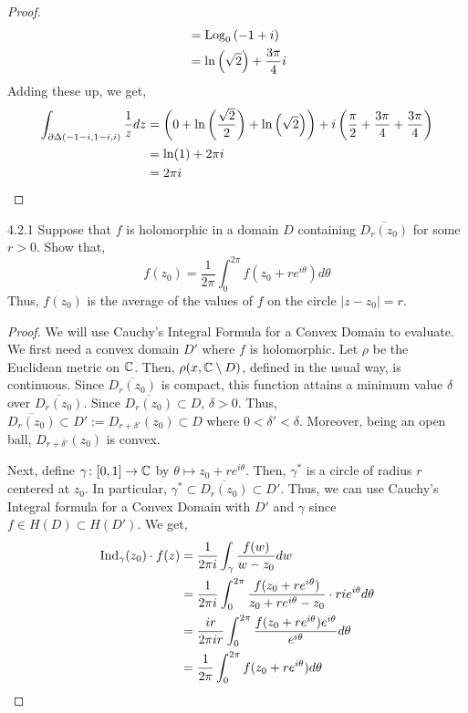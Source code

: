 \documentclass[12pt]{amsart}
\begin{document}
\begin{proof}
\begin{align*}
       &= \operatorname{Log}_0\left(-1+i\right) \\
       &= \ln\left(\sqrt{2}\right) + \frac{3\pi}{4}i
    \end{align*}
    Adding these up, we get,
    \begin{align*}
        \int_{\partial\Delta(-1-i, 1-i, i)} \frac{1}{z} dz &= \left(0 + \ln\left(\frac{\sqrt{2}}{2}\right)+ \ln\left(\sqrt{2}\right)\right) + i\left( \frac{\pi}{2} + \frac{3\pi}{4} + \frac{3\pi}{4}\right) \\
        &= \ln(1) + 2\pi i \\ 
        &= 2\pi i
    \end{align*}
\end{proof}
\newpage

\begin{problem}{4.2.1}
    Suppose that $f$ is holomorphic in a domain $D$ containing $\overline{D_r(z_0)}$ for some $r > 0$. Show that, 
    \[ f(z_0) = \frac{1}{2\pi} \int_0^{2\pi} f(z_0 + re^{i\theta})d\theta\]
    Thus, $f(z_0)$ is the average of the values of $f$ on the circle $|z-z_0| = r$. 
\end{problem}
\begin{proof}
    We will use Cauchy's Integral Formula for a Convex Domain to evaluate. We first need a convex domain $D'$ where $f$ is holomorphic. Let $\rho$ be the Euclidean metric on $\mathbb C$. Then, $\rho(x, \mathbb C \setminus D)$, defined in the usual way, is continuous. Since $\overline{D_r(z_0)}$ is compact, this function attains a minimum value $\delta$ over $\overline{D_r(z_0)}$. Since $\overline{D_r(z_0)} \subset D$, $\delta > 0$. Thus, $\overline{D_r(z_0)} \subset D' := D_{r+\delta'}(z_0) \subset D$ where $0 < \delta' < \delta$. Moreover, being an open ball, $D_{r+\delta'}(z_0)$ is convex.
    
    Next, define $\gamma\colon [0, 1] \to \mathbb C$ by $\theta \mapsto z_0 + re^{i\theta}$. Then, $\gamma^*$ is a circle of radius $r$ centered at $z_0$. In particular, $\gamma^* \subset \overline{D_r(z_0)} \subset D'$. Thus, we can use Cauchy's Integral formula for a Convex Domain with $D'$ and $\gamma$ since $f \in H(D) \subset H(D')$. We get, 
    \begin{align*}
        \operatorname{Ind}_\gamma(z_0) \cdot f(z) &= \frac{1}{2\pi i}\int_\gamma \frac{f(w)}{w-z_0} dw \\
        &= \frac{1}{2\pi i}\int_0^{2\pi} \frac{f(z_0+re^{i\theta})}{z_0+re^{i\theta}-z_0} \cdot rie^{i\theta} d\theta \\
        &= \frac{ir}{2\pi i r}\int_0^{2\pi} \frac{f(z_0+re^{i\theta})e^{i\theta}}{e^{i\theta}} d\theta \\
        &= \frac{1}{2\pi}\int_0^{2\pi} f(z_0+re^{i\theta}) d\theta    
    \end{align*}

\end{proof}
\newpage
\end{document}
